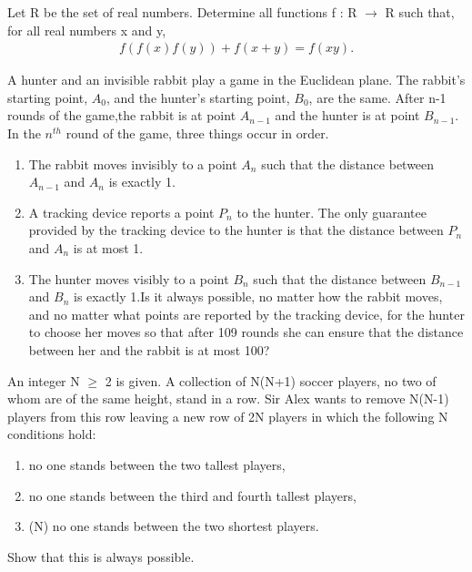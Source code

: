 \item Let R be the set of real numbers. Determine all functions f : R $ \rightarrow $ R such that, for
all real numbers x and y,
\begin{align*}
f(f(x)f(y)) + f(x + y) = f(xy).
\end{align*}

\item A hunter and an invisible rabbit play a game in the Euclidean plane. The rabbit’s starting point, $A_0$, and the hunter’s starting point, $B_0$, are the same. After n-1 rounds of the game,the rabbit is at point $A_{n-1}$ and the hunter is at point $B_{n-1}$. In the $n^{th}$ round of the game, three things occur in order.
\begin{enumerate}
\item The rabbit moves invisibly to a point $A_n$ such that the distance between $A_{n-1}$ and $A_n$ is exactly 1.
\item A tracking device reports a point $P_n$ to the hunter. The only guarantee provided by the tracking device to the hunter is that the distance between $P_n$ and $A_n$ is at most 1.
\item The hunter moves visibly to a point $B_n$ such that the distance between $B_{n-1}$ and $B_n$ is exactly 1.Is it always possible, no matter how the rabbit moves, and no matter what points are reported by the tracking device, for the hunter to choose her moves so that after 109 rounds she can ensure that the distance between her and the rabbit is at most 100?
\end{enumerate}

\item An integer N $\geq$ 2 is given. A collection of N(N+1) soccer players, no two of whom
are of the same height, stand in a row. Sir Alex wants to remove N(N-1) players from this row
leaving a new row of 2N players in which the following N conditions hold:
\begin{enumerate}
\item no one stands between the two tallest players,
\item no one stands between the third and fourth tallest players,
\item (N) no one stands between the two shortest players.
\end{enumerate}
Show that this is always possible.
